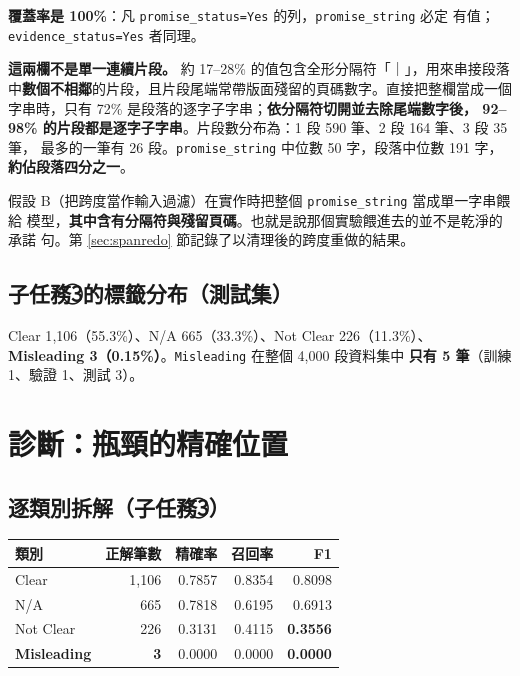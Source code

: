 \documentclass[11pt,a4paper]{ctexart}
\newcommand{\fn}[1]{\texttt{#1}}
\begin{document}
\textbf{覆蓋率是 100\%}：凡 \fn{promise\_status=Yes} 的列，\fn{promise\_string} 必定
有值；\fn{evidence\_status=Yes} 者同理。

\textbf{這兩欄不是單一連續片段。} 約 17--28\% 的值包含全形分隔符「｜」，用來串接段落
中\textbf{數個不相鄰}的片段，且片段尾端常帶版面殘留的頁碼數字。直接把整欄當成一個
字串時，只有 72\% 是段落的逐字子字串；\textbf{依分隔符切開並去除尾端數字後，
92--98\% 的片段都是逐字子字串}。片段數分布為：1 段 590 筆、2 段 164 筆、3 段 35 筆，
最多的一筆有 26 段。\fn{promise\_string} 中位數 50 字，段落中位數 191 字，
\textbf{約佔段落四分之一}。

\begin{tcolorbox}[colback=yellow!8, colframe=orange!60, title=這個結構影響了假設 B]
假設 B（把跨度當作輸入過濾）在實作時把整個 \fn{promise\_string} 當成單一字串餵給
模型，\textbf{其中含有分隔符與殘留頁碼}。也就是說那個實驗餵進去的並不是乾淨的承諾
句。第 \ref{sec:spanredo} 節記錄了以清理後的跨度重做的結果。
\end{tcolorbox}

\subsection{子任務\textcircled{3}的標籤分布（測試集）}

Clear 1{,}106（55.3\%）、N/A 665（33.3\%）、Not Clear 226（11.3\%）、
\textbf{Misleading 3（0.15\%）}。\fn{Misleading} 在整個 4{,}000 段資料集中
\textbf{只有 5 筆}（訓練 1、驗證 1、測試 3）。

\section{診斷：瓶頸的精確位置}

\subsection{逐類別拆解（子任務\textcircled{3}）}

\begin{table}[h]
\centering\small
\begin{tabular}{@{}lrrrr@{}}
\toprule
類別 & 正解筆數 & 精確率 & 召回率 & F1 \\
\midrule
Clear      & 1{,}106 & 0.7857 & 0.8354 & 0.8098 \\
N/A        & 665     & 0.7818 & 0.6195 & 0.6913 \\
\rowcolor{yellow!15}
Not Clear  & 226     & 0.3131 & 0.4115 & \textbf{0.3556} \\
\rowcolor{red!10}
\textbf{Misleading} & \textbf{3} & 0.0000 & 0.0000 & \textbf{0.0000} \\
\bottomrule
\end{tabular}
\end{table}
\end{document}
